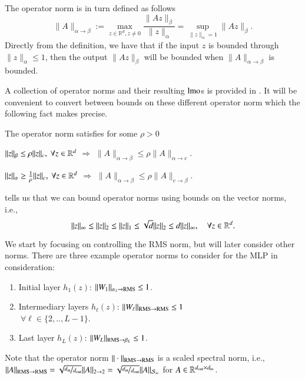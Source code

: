 The operator norm is in turn defined as follows 
\begin{equation}\label{eq:opnorm}
\|A\|_{\alpha \rightarrow \beta}
:=\max_{z \in \mathbb{R}^d, z \neq 0} \frac{\|Az\|_\beta}{\|z\|_\alpha}
= \sup_{\|z\|_\alpha = 1} \|Az\|_\beta.
\end{equation}
Directly from the definition, we have that if the input $z$ is bounded through $\|z\|_\alpha\leq 1$, then the output $\|Az\|_\beta$ will be bounded when $\|A\|_{\alpha \rightarrow \beta}$ is bounded.

A collection of operator norms and their resulting $\operatorname{lmo}$s is provided in .
It will be convenient to convert between bounds on these different operator norm which the following fact makes precise.
\begin{fact}\label{lem:operator:bound}
The operator norm satisfies for some $\rho > 0$
\begin{lemnum}
\item $\|z\|_\beta \leq \rho \|z\|_c, \ \forall z\in \mathbb{R}^d$  $\Rightarrow$ $\|A\|_{\alpha\rightarrow \beta} \leq \rho \|A\|_{\alpha\rightarrow c}$.
\item $\|z\|_\alpha \geq \tfrac{1}{\rho} \|z\|_c,\ \forall z\in \mathbb{R}^d$ $\Rightarrow$ $\|A\|_{\alpha\rightarrow \beta} \leq \rho \|A\|_{c\rightarrow \beta}$.
\end{lemnum}
\end{fact}
 tells us that we can bound operator norms using bounds on the vector norms, i.e.,
\begin{equation}\label{eq:vectornorm:bounds}
\|z\|_\infty \leq \|z\|_2 \leq \|z\|_1 \leq \sqrt{d} \|z\|_2 \leq d \|z\|_\infty, 
\quad \forall z\in \mathbb{R}^d.
\end{equation}

We start by focusing on controlling the RMS norm, but will later consider other norms.
There are three example operator norms to consider for the MLP in consideration:
\begin{enumerate}[label=(\roman*)]
  \item Initial layer $h_1(z)$: $\|W_1\|_{\alpha_1 \rightarrow \mathrm{RMS}} \leq 1$.
  \item Intermediary layers $h_\ell(z)$: $\|W_\ell\|_{\mathrm{RMS} \rightarrow \mathrm{RMS}} \leq 1$\\$ \ \forall \ell \in \{2,..,L-1\}$.
  \item Last layer $h_L(z)$: $\|W_L\|_{\mathrm{RMS} \rightarrow \beta_L} \leq 1$.
\end{enumerate}
Note that the operator norm $\|\cdot\|_{\mathrm{RMS} \rightarrow \mathrm{RMS}}$ is a scaled spectral norm, i.e., $\|A\|_{\mathrm{RMS} \rightarrow \mathrm{RMS}}=\sqrt{\nicefrac{d_{\mathrm{in}}}{d_{\mathrm{out}}}}\|A\|_{2 \rightarrow 2}=\sqrt{\nicefrac{d_{\mathrm{in}}}{d_{\mathrm{out}}}}\|A\|_{\mathcal{S}_{\infty}}$ for $A\in \mathbb{R}^{d_\mathrm{out} \times d_\mathrm{in}}$.

